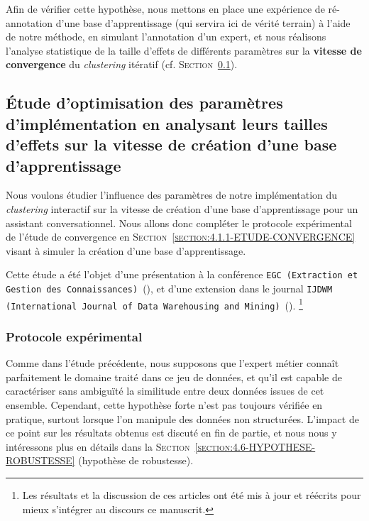 	Afin de vérifier cette hypothèse, nous mettons en place une expérience de ré-annotation d'une base d'apprentissage (qui servira ici de vérité terrain) à l'aide de notre méthode, en simulant l'annotation d'un expert, et nous réalisons l'analyse statistique de la taille d'effets de différents paramètres sur la \textbf{vitesse de convergence} du \textit{clustering} itératif (cf. \textsc{Section~\ref{section:4.2.1-ETUDE-OPTIMISATION}}).
	
		
	\subsection{Étude d'optimisation des paramètres d'implémentation en analysant leurs tailles d'effets sur la vitesse de création d'une base d'apprentissage}
	\label{section:4.2.1-ETUDE-OPTIMISATION}

		Nous voulons étudier l'influence des paramètres de notre implémentation du \textit{clustering} interactif sur la vitesse de création d'une base d'apprentissage pour un assistant conversationnel.
		Nous allons donc compléter le protocole expérimental de l'étude de convergence en \textsc{Section~\ref{section:4.1.1-ETUDE-CONVERGENCE}} visant à simuler la création d'une base d'apprentissage.
			
		\begin{leftBarInformation}
			Cette étude a été l'objet d'une présentation à la conférence \texttt{EGC (Extraction et Gestion des Connaissances)}~(\cite{schild-etal:2021:conception-iterative-semisupervisee}), et d'une extension dans le journal \texttt{IJDWM (International Journal of Data Warehousing and Mining)}~(\cite{schild-etal:2022:iterative-semisupervised-design}).
			\footnote{
				Les résultats et la discussion de ces articles ont été mis à jour et réécrits pour mieux s'intégrer au discours ce manuscrit.
			}
		\end{leftBarInformation}

		\subsubsection{Protocole expérimental}
			
			\begin{leftBarWarning}
				Comme dans l'étude précédente, nous supposons que l'expert métier connaît parfaitement le domaine traité dans ce jeu de données, et qu'il est capable de caractériser sans ambiguïté la similitude entre deux données issues de cet ensemble.
				Cependant, cette hypothèse forte n'est pas toujours vérifiée en pratique, surtout lorsque l'on manipule des données non structurées.
				L'impact de ce point sur les résultats obtenus est discuté en fin de partie, et nous nous y intéressons plus en détails dans la \textsc{Section~\ref{section:4.6-HYPOTHESE-ROBUSTESSE}} (hypothèse de robustesse).
			\end{leftBarWarning}
			
